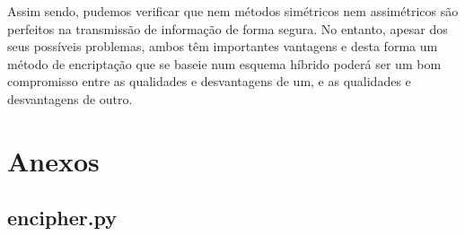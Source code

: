 \documentclass[a4paper,11pt,openright,oneside]{report}
\begin{document}
Assim sendo, pudemos verificar que nem métodos simétricos nem assimétricos são perfeitos na transmissão de informação de forma segura. No entanto, apesar dos seus possíveis problemas, ambos têm importantes vantagens e desta forma um método de encriptação que se baseie num esquema híbrido poderá ser um bom compromisso entre as qualidades e desvantagens de um, e as qualidades e desvantagens de outro. 

\chapter*{Anexos}

\section*{encipher.py}
\label{App:encipher.py}
\end{document}
